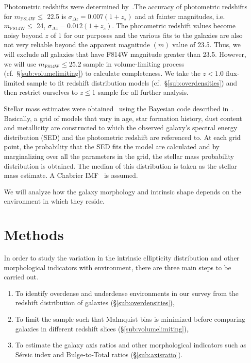 \documentclass[twocolumn,useAMS,usenatbib]{mn2e}
\newcommand{\rachel}[1]{}
\newcommand{\sersic}{S\'{e}rsic }
\begin{document}
Photometric redshifts were determined by~\cite{COSMOS_Photoz_30band}.The accuracy of photometric redshifts for $m_\text{F814W}\le$ 22.5 is $\sigma_{\Delta z} = 0.007(1+z_s)$ and at fainter magnitudes, i.e. $m_\text{F814W}\le$ 24, $\sigma_{\Delta z} = 0.012(1+z_s)$.
The photometric redshift values become noisy beyond $z$ of $1$ for our purposes and the various fits to the galaxies are also not very reliable beyond the apparent magnitude $(m)$ value of 23.5. 
Thus, we will exclude all galaxies that have F814W magnitude greater than 23.5. However, we will use $m_\text{F814W}\le 25.2$ sample in volume-limiting process (cf.~\S\ref{sub:volumelimiting}) to calculate completeness.  We take the $z<1.0$ flux-limited sample to fit redshift distribution models (cf.~\S\ref{sub:overdensities}) and then restrict ourselves to $z\le1$ sample for all further analysis.

Stellar mass estimates were obtained~\citep{COSMOS_XRAY} using the Bayesian code described in~\cite{KEVIN_MSTAR}. Basically, a grid of models that vary in age, star formation history, dust content and metallicity
are constructed to which the observed galaxy's spectral energy distribution (SED) and the photometric redshift are referenced to. At each grid point, the probability that the 
SED fits the model are calculated and by marginalizing over all the parameters in the grid, the stellar mass probability distribution is obtained. The median of this distribution
is taken as the stellar mass estimate. A Chabrier IMF~\citep{ChabrierIMF} is assumed.
  
We will analyze how the galaxy morphology and intrinsic shape depends on
the environment in which they reside.

\section{Methods}
\label{S:methods}

In order to study the variation in the intrinsic ellipticity distribution and other morphological indicators with environment, there are three main steps to be carried out.
\begin{enumerate}
 \item To identify overdense and underdense environments in our survey from the redshift distribution of galaxies (\S\ref{sub:overdensities}),
 \item To limit the sample such that Malmquist bias is minimized before comparing galaxies in different redshift slices (\S\ref{sub:volumelimiting}),
 \item To estimate the galaxy axis ratios and other morphological indicators such as  \sersic index and Bulge-to-Total ratios (\S\ref{sub:axisratio}).
\end{enumerate}
\end{document}
